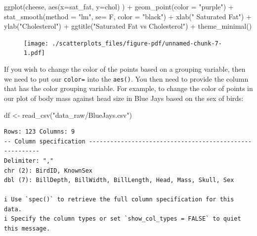 \documentclass[
  letterpaper,
  DIV=11,
  numbers=noendperiod]{scrreprt}
\newenvironment{Shaded}{\begin{snugshade}}{\end{snugshade}}
\newcommand{\AttributeTok}[1]{\textcolor[rgb]{0.40,0.45,0.13}{#1}}
\newcommand{\FunctionTok}[1]{\textcolor[rgb]{0.28,0.35,0.67}{#1}}
\newcommand{\NormalTok}[1]{\textcolor[rgb]{0.00,0.23,0.31}{#1}}
\newcommand{\OtherTok}[1]{\textcolor[rgb]{0.00,0.23,0.31}{#1}}
\newcommand{\SpecialCharTok}[1]{\textcolor[rgb]{0.37,0.37,0.37}{#1}}
\newcommand{\StringTok}[1]{\textcolor[rgb]{0.13,0.47,0.30}{#1}}
\begin{document}
\begin{Shaded}
\begin{Highlighting}[]
\FunctionTok{ggplot}\NormalTok{(cheese, }\FunctionTok{aes}\NormalTok{(}\AttributeTok{x=}\NormalTok{sat\_fat, }\AttributeTok{y=}\NormalTok{chol) ) }\SpecialCharTok{+} 
  \FunctionTok{geom\_point}\NormalTok{(}\AttributeTok{color =} \StringTok{"purple"}\NormalTok{) }\SpecialCharTok{+}
  \FunctionTok{stat\_smooth}\NormalTok{(}\AttributeTok{method =} \StringTok{"lm"}\NormalTok{, }\AttributeTok{se=}\NormalTok{ F, }\AttributeTok{color =} \StringTok{"black"}\NormalTok{) }\SpecialCharTok{+}
  \FunctionTok{xlab}\NormalTok{(}\StringTok{" Saturated Fat"}\NormalTok{) }\SpecialCharTok{+}
  \FunctionTok{ylab}\NormalTok{(}\StringTok{"Cholesterol"}\NormalTok{) }\SpecialCharTok{+}
  \FunctionTok{ggtitle}\NormalTok{(}\StringTok{"Saturated Fat vs Cholesterol"}\NormalTok{) }\SpecialCharTok{+}
  \FunctionTok{theme\_minimal}\NormalTok{()}
\end{Highlighting}
\end{Shaded}

\begin{figure}[H]

{\centering \texttt{[image: ./scatterplots\_files/figure-pdf/unnamed-chunk-7-1.pdf]}

}

\end{figure}

If you wish to change the color of the points based on a grouping
variable, then we need to put our \texttt{color=} into the
\texttt{aes()}. You then need to provide the column that has the color
grouping variable. For example, to change the color of points in our
plot of body mass against head size in Blue Jays based on the sex of
birds:

\begin{Shaded}
\begin{Highlighting}[]
\NormalTok{df }\OtherTok{\textless{}{-}} \FunctionTok{read\_csv}\NormalTok{(}\StringTok{"data\_raw/BlueJays.csv"}\NormalTok{)}
\end{Highlighting}
\end{Shaded}

\begin{verbatim}
Rows: 123 Columns: 9
-- Column specification --------------------------------------------------------
Delimiter: ","
chr (2): BirdID, KnownSex
dbl (7): BillDepth, BillWidth, BillLength, Head, Mass, Skull, Sex

i Use `spec()` to retrieve the full column specification for this data.
i Specify the column types or set `show_col_types = FALSE` to quiet this message.
\end{verbatim}
\end{document}
